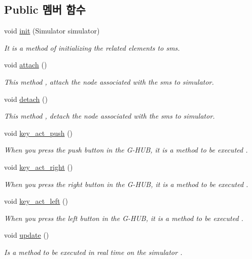 \subsection*{Public 멤버 함수}
\begin{DoxyCompactItemize}
\item 
void \hyperlink{classkr_1_1ac_1_1kookmin_1_1cs_1_1sms_1_1_sms_hud_ac31dd21aa4220865cb34708393e8d327}{init} (Simulator simulator)
\begin{DoxyCompactList}\small\item\em It is a method of initializing the related elements to sms. \end{DoxyCompactList}\item 
void \hyperlink{classkr_1_1ac_1_1kookmin_1_1cs_1_1sms_1_1_sms_hud_ac77113a967501501241ec8fb024c8ac9}{attach} ()
\begin{DoxyCompactList}\small\item\em This method , attach the node associated with the sms to simulator. \end{DoxyCompactList}\item 
void \hyperlink{classkr_1_1ac_1_1kookmin_1_1cs_1_1sms_1_1_sms_hud_a2a7552edf772b43284e9d2f3b70fd759}{detach} ()
\begin{DoxyCompactList}\small\item\em This method , detach the node associated with the sms to simulator. \end{DoxyCompactList}\item 
void \hyperlink{classkr_1_1ac_1_1kookmin_1_1cs_1_1sms_1_1_sms_hud_a1c2424be5b993ce96c3e2d0a8ebb952f}{key\+\_\+act\+\_\+push} ()
\begin{DoxyCompactList}\small\item\em When you press the push button in the G-\/\+H\+U\+B, it is a method to be executed . \end{DoxyCompactList}\item 
void \hyperlink{classkr_1_1ac_1_1kookmin_1_1cs_1_1sms_1_1_sms_hud_a6183a230794f74ff5ca37f481ec8267f}{key\+\_\+act\+\_\+right} ()
\begin{DoxyCompactList}\small\item\em When you press the right button in the G-\/\+H\+U\+B, it is a method to be executed . \end{DoxyCompactList}\item 
void \hyperlink{classkr_1_1ac_1_1kookmin_1_1cs_1_1sms_1_1_sms_hud_af5cfee98fa47381d2267bf9feeecab35}{key\+\_\+act\+\_\+left} ()
\begin{DoxyCompactList}\small\item\em When you press the left button in the G-\/\+H\+U\+B, it is a method to be executed . \end{DoxyCompactList}\item 
void \hyperlink{classkr_1_1ac_1_1kookmin_1_1cs_1_1sms_1_1_sms_hud_aa96a9ed0966f86c0819d4fdeba8f6837}{update} ()
\begin{DoxyCompactList}\small\item\em Is a method to be executed in real time on the simulator . \end{DoxyCompactList}\end{DoxyCompactItemize}
